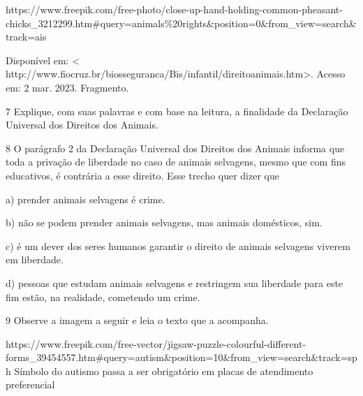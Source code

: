 https://www.freepik.com/free-photo/close-up-hand-holding-common-pheasant-chicks\_3212299.htm\#query=animals\%20rights\&position=0\&from\_view=search\&track=ais

Disponível em: \textless{}
http://www.fiocruz.br/biosseguranca/Bis/infantil/direitoanimais.htm\textgreater.
Acesso em: 2 mar. 2023. Fragmento.

\num{7} Explique, com suas palavras e com base na leitura, a finalidade
da Declaração Universal dos Direitos dos Animais.


\num{8} O parágrafo 2 da Declaração Universal dos Direitos dos Animais
informa que toda a privação de liberdade no caso de animais selvagens,
mesmo que com fins educativos, é contrária a esse direito. Esse trecho
quer dizer que

a) prender animais selvagens é crime.

b) não se podem prender animais selvagens, mas animais domésticos, sim.

c) é um dever dos seres humanos garantir o direito de animais selvagens
viverem em liberdade.

d) pessoas que estudam animais selvagens e restringem sua liberdade para
este fim estão, na realidade, cometendo um crime.


\num{9} Observe a imagem a seguir e leia o texto que a acompanha.

https://www.freepik.com/free-vector/jigsaw-puzzle-colourful-different-forms\_39454557.htm\#query=autism\&position=10\&from\_view=search\&track=sph
Símbolo do autismo passa a ser obrigatório em placas de atendimento
preferencial

